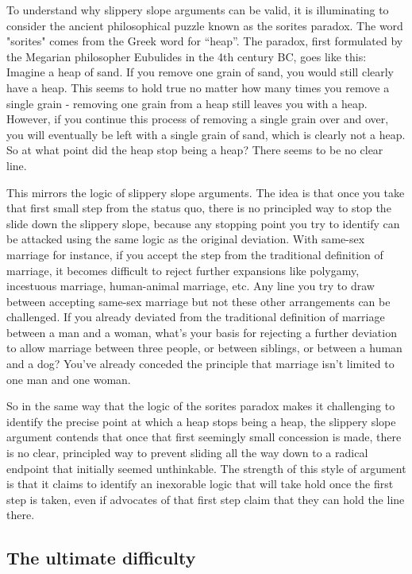 \documentclass{article}
\begin{document}
To understand why slippery slope arguments can be valid, it is illuminating to consider the ancient philosophical puzzle known as the sorites paradox. The word "sorites" comes from the Greek word for ``heap''. The paradox, first formulated by the Megarian philosopher Eubulides in the 4th century BC, goes like this: Imagine a heap of sand. If you remove one grain of sand, you would still clearly have a heap. This seems to hold true no matter how many times you remove a single grain - removing one grain from a heap still leaves you with a heap. However, if you continue this process of removing a single grain over and over, you will eventually be left with a single grain of sand, which is clearly not a heap. So at what point did the heap stop being a heap? There seems to be no clear line.\autocite{hydeSoritesParadox2018}

This mirrors the logic of slippery slope arguments. The idea is that once you take that first small step from the status quo, there is no principled way to stop the slide down the slippery slope, because any stopping point you try to identify can be attacked using the same logic as the original deviation.  With same-sex marriage for instance, if you accept the step from the traditional definition of marriage, it becomes difficult to reject further expansions like polygamy, incestuous marriage, human-animal marriage, etc. Any line you try to draw between accepting same-sex marriage but not these other arrangements can be challenged. If you already deviated from the traditional definition of marriage between a man and a woman, what's your basis for rejecting a further deviation to allow marriage between three people, or between siblings, or between a human and a dog? You've already conceded the principle that marriage isn't limited to one man and one woman.

So in the same way that the logic of the sorites paradox makes it challenging to identify the precise point at which a heap stops being a heap, the slippery slope argument contends that once that first seemingly small concession is made, there is no clear, principled way to prevent sliding all the way down to a radical endpoint that initially seemed unthinkable. The strength of this style of argument is that it claims to identify an inexorable logic that will take hold once the first step is taken, even if advocates of that first step claim that they can hold the line there.

\subsection{The ultimate difficulty}
\end{document}
